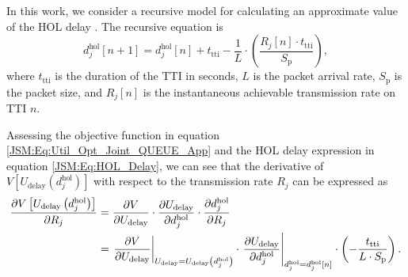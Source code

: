 \begin{apendicesenv}
In this work, we consider a recursive model for calculating an approximate value of the \ac{HOL} delay \cite{Rodrigues2014_Wiley}. The recursive equation is
%
\begin{equation}
\label{JSM:Eq:HOL_Delay}
d_{j}^\mathrm{hol}\left[n+1\right] = d_{j}^\mathrm{hol}\left[n\right] + t_{\mathrm{tti}} - \frac{1}{L} \cdot \left( \frac{R_j\left[n\right] \cdot t_{\mathrm{tti}}}{S_\mathrm{p}}\right),
\end{equation}
%
where $t_{\mathrm{tti}}$ is the duration of the \ac{TTI} in seconds, $L$ is the packet arrival rate, $S_\mathrm{p}$ is the packet size, and $R_{j}\left[n\right]$ is the instantaneous achievable transmission rate on \ac{TTI} $n$. 

Assessing the objective function in equation \eqref{JSM:Eq:Util_Opt_Joint_QUEUE_App} and the \ac{HOL} delay expression in equation \eqref{JSM:Eq:HOL_Delay}, we can see that the derivative of $V\left[U_{\mathrm{delay}}\left(d_{j}^\mathrm{hol}\right)\right]$ with respect to the transmission rate $R_j$ can be expressed as
%
\begin{align}
\label{JSM:Eq:Utility_Derivative_QUEUE}
\frac{\partial V\left[U_{\mathrm{delay}}\left(d_{j}^\mathrm{hol}\right)\right]}{\partial R_j} & =
\frac{\partial V}{\partial U_{\mathrm{delay}}}
\cdot
\frac{\partial U_{\mathrm{delay}}}{\partial d_j^\mathrm{hol}}
\cdot
\frac{\partial d_j^\mathrm{hol}}{\partial R_j} \notag\\ & =
\left.\dfrac{\partial V}{\partial U_{\mathrm{delay}}}\right\vert_{U_{\mathrm{delay}} = U_{\mathrm{delay}}\left(d_j^\mathrm{hol}\right)}
\cdot
\left.\dfrac{\partial U_{\mathrm{delay}}}{\partial d_j^\mathrm{hol}}\right\vert_{d_{j}^\mathrm{hol} = d_{j}^\mathrm{hol}\left[n\right]}
\cdot
\left(-\frac{t_{\mathrm{tti}}}{L \cdot S_\mathrm{p}} \right).
\end{align}


\end{apendicesenv}
